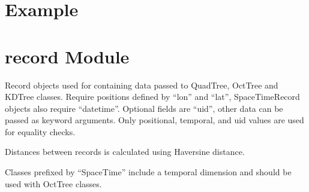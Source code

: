 \documentclass[letterpaper,10pt,english]{sphinxmanual}
\begin{document}
\section{Example}
\label{\detokenize{record:example}}
\begin{sphinxVerbatim}[commandchars=\\\{\}]
 

     
     
\end{sphinxVerbatim}


\section{record Module}
\label{\detokenize{record:module-geotrees.record}}\label{\detokenize{record:record-module}}
\sphinxAtStartPar
Record objects used for containing data passed to QuadTree, OctTree and KDTree
classes. Require positions defined by “lon” and “lat”, SpaceTimeRecord objects
also require “datetime”. Optional fields are “uid”, other data can be passed as
keyword arguments. Only positional, temporal, and uid values are used for
equality checks.

\sphinxAtStartPar
Distances between records is calculated using Haversine distance.

\sphinxAtStartPar
Classes prefixed by “SpaceTime” include a temporal dimension and should be used
with OctTree classes.
\end{document}
